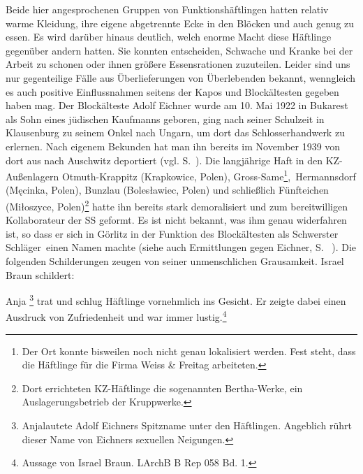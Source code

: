 Beide hier angesprochenen Gruppen von Funktionshäftlingen hatten relativ warme Kleidung, ihre eigene abgetrennte Ecke in den Blöcken und auch genug zu essen. Es wird da\-rüber hinaus deutlich, welch enorme Macht diese Häftlinge gegenüber andern hatten. Sie konnten entscheiden, Schwache und Kranke bei der Arbeit zu schonen oder ihnen größere Essensrationen zuzuteilen. Leider sind uns nur gegenteilige Fälle aus Überlieferungen von Überlebenden bekannt, wenngleich es auch positive Einflussnahmen seitens der Kapos und Blockältesten gegeben haben mag.
\newline
Der Blockälteste\label{eichner} Adolf Eichner wurde am 10. Mai 1922 in Bukarest als Sohn eines jüdischen Kaufmanns geboren, ging nach seiner Schulzeit in Klausenburg zu seinem Onkel nach Ungarn, um dort das Schlosserhandwerk zu erlernen. Nach eigenem Bekunden hat man ihn bereits im November 1939 von dort aus nach Auschwitz deportiert (vgl. S.~\pageref{ungarn}). Die langjährige Haft in den KZ-Außenlagern Otmuth-Krappitz (Krapkowice, Polen), Gross-Same\footnote{Der Ort konnte bisweilen noch nicht genau lokalisiert werden. Fest steht, dass die Häftlinge für die Firma Weiss \& Freitag arbeiteten.},~Hermannsdorf (Męcinka, Polen), Bunzlau (Boles\l awiec, Polen) und schließlich Fünfteichen (Mi\l oszyce, Polen)\footnote{Dort errichteten KZ-Häftlinge die sogenannten \glqq Bertha-Werke\grqq, ein Auslagerungsbetrieb der Kruppwerke.} hatte ihn bereits stark demoralisiert und zum bereitwilligen Kollaborateur der SS geformt. Es ist nicht bekannt, was ihm genau widerfahren ist, so dass er sich in Görlitz in der Funktion des Blockältesten als \glqq Schwerster Schläger\grqq~einen Namen machte (siehe auch Ermittlungen gegen Eichner, S. ~\pageref{eichner_ahndung}). Die folgenden Schilderungen zeugen von seiner unmenschlichen Grausamkeit. Israel Braun schildert:\label{turnen}
\begin{leftbar}
Anja \footnote{\glqq Anja\grqq lautete Adolf Eichners Spitzname unter den Häftlingen. Angeblich rührt dieser Name von Eichners sexuellen Neigungen.} trat und schlug Häftlinge vornehmlich ins Gesicht. Er zeigte dabei einen Ausdruck von Zufriedenheit und war immer lustig.\footnote{Aussage von Israel Braun. LArchB B Rep 058 Bd. 1.}
\end{leftbar}

